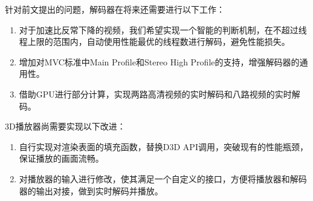 针对前文提出的问题，解码器在将来还需要进行以下工作：
\begin{enumerate}
\item 对于加速比反常下降的视频，我们希望实现一个智能的判断机制，在不超过线程上限的范围内，自动使用性能最优的线程数进行解码，避免性能损失。
\item 增加对MVC标准中Main Profile和Stereo High Profile的支持，增强解码器的通用性。
\item 借助GPU进行部分计算，实现两路高清视频的实时解码和八路视频的实时解码。
\end{enumerate}

3D播放器尚需要实现以下改进：
\begin{enumerate}
\item 自行实现对渲染表面的填充函数，替换D3D API调用，突破现有的性能瓶颈，保证播放的画面流畅。
\item 对播放器的输入进行修改，使其满足一个自定义的接口，方便将播放器和解码器的输出对接，做到实时解码并播放。
\end{enumerate}
